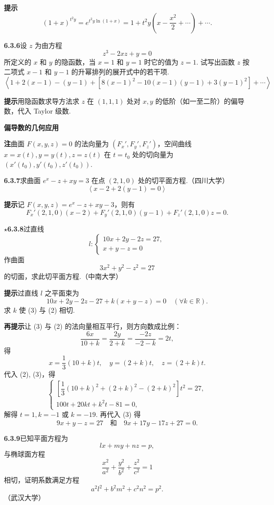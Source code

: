\documentclass[UTF8,12pt,a4paper,fontset=fandol]{ctexart}
\begin{document}
\noindent\textbf{提示}\quad
\[
  (1+x)^{t^2y}=e^{t^2y\ln(1+x)}
  =1+t^2y\left(x-\frac{x^2}{2}+\cdots\right)+\cdots.
\]

\noindent\textbf{6.3.6}\quad 设 $z$ 为由方程
\[
  z^3-2xz+y=0
\]
所定义的 $x$ 和 $y$ 的隐函数，当 $x=1$ 和 $y=1$ 时它的值为 $z=1$. 试写出函数 $z$ 按二项式 $x-1$ 和 $y-1$ 的升幂排列的展开式中的若干项.
\[
  \left\langle
  1+2(x-1)-(y-1)+[8(x-1)^2-10(x-1)(y-1)+3(y-1)^2]+\cdots
  \right\rangle
\]

\noindent\textbf{提示}\quad 用隐函数求导方法求 $z$ 在 $(1,1,1)$ 处对 $x,y$ 的低阶（如一至二阶）的偏导数，代入 Taylor 级数.

\noindent\textbf{偏导数的几何应用}

\noindent\textbf{注}\quad 曲面 $F(x,y,z)=0$ 的法向量为 $(F_x',F_y',F_z')$，空间曲线 $x=x(t),y=y(t),z=z(t)$ 在 $t=t_0$ 处的切向量为 $(x'(t_0),y'(t_0),z'(t_0))$.

\noindent\textbf{6.3.7}\quad 求曲面 $e^x-z+xy=3$ 在点 $(2,1,0)$ 处的切平面方程.（四川大学）
\[
  \left\langle x-2+2(y-1)=0\right\rangle
\]

\noindent\textbf{提示}\quad 记 $F(x,y,z)=e^x-z+xy-3$，则有
\[
  F_x'(2,1,0)(x-2)+F_y'(2,1,0)(y-1)+F_z'(2,1,0)z=0.
\]

\noindent\textbf{\ensuremath{\star}6.3.8}\quad 过直线
\[
  l:\begin{cases}
    10x+2y-2z=27,\\
    x+y-z=0
  \end{cases} \tag{1}
\]
作曲面
\[
  3x^2+y^2-z^2=27 \tag{2}
\]
的切面，求此切平面方程.（中南大学）

\noindent\textbf{提示}\quad 过直线 $l$ 之平面束为
\[
  10x+2y-2z-27+k(x+y-z)=0\quad(\forall k\in\mathbb{R}). \tag{3}
\]
求 $k$ 使 (3) 与 (2) 相切.

\noindent\textbf{再提示}\quad 让 (3) 与 (2) 的法向量相互平行，则方向数成比例：
\[
  \frac{6x}{10+k}=\frac{2y}{2+k}=\frac{-2z}{-2-k}=2t,
\]
得
\[
  x=\frac13(10+k)t,\quad y=(2+k)t,\quad z=(2+k)t.
\]
代入 (2), (3)，得
\[
  \begin{cases}
    \left[\dfrac13(10+k)^2+(2+k)^2-(2+k)^2\right]t^2=27,\\
    100t+20kt+k^2t-81=0,
  \end{cases}
\]
解得 $t=1,k=-1$ 或 $k=-19$. 再代入 (3) 得
\[
  9x+y-z=27
  \quad\text{和}\quad
  9x+17y-17z+27=0.
\]

\noindent\textbf{6.3.9}\quad 已知平面方程为
\[
  lx+my+nz=p, \tag{1}
\]
与椭球面方程
\[
  \frac{x^2}{a^2}+\frac{y^2}{b^2}+\frac{z^2}{c^2}=1 \tag{2}
\]
相切，证明系数满足方程
\[
  a^2l^2+b^2m^2+c^2n^2=p^2. \tag{3}
\]
（武汉大学）
\end{document}

